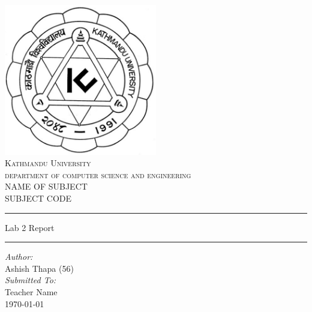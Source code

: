 \documentclass[a4paper]{article}
\begin{document}
\begin{titlepage}
	\begin{center}
		\includegraphics[width=0.5\textwidth]{assets/ku.png}\\[1cm]
		\textsc{\LARGE Kathmandu University}\\[0.2cm]
		\textsc{\large department of computer science and engineering}\\[2cm]


\textsc{\Large NAME OF SUBJECT }\\[0.2cm]
\textsc{\large SUBJECT CODE}\\[1cm]

\hrule \vspace{0.5cm}
{\Large Lab 2 Report} \\[0.5cm]
\hrule \vspace{0.5cm}

\large
\emph{Author:}\\
Ashish Thapa (56)\\[1cm]	

\emph{Submitted To:}\\
Teacher Name \\[2cm]

{\large \today}\\[5cm]

	\end{center}
\end{titlepage}

\section{}
\end{document}
